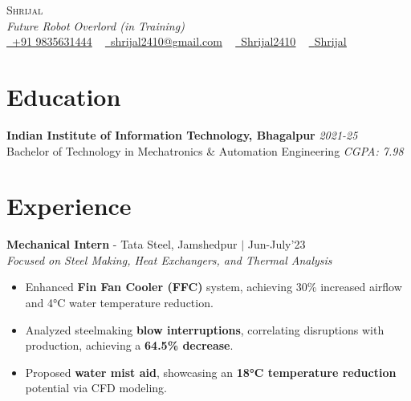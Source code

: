 \documentclass[letterpaper,11pt]{article}
\begin{document}
\begin{center}
    {\Huge \scshape Shrijal} \\[4pt]
    \textit{Future Robot Overlord (in Training)} \\[4pt]
    \href{tel:9835631444}{\color{MidnightBlue}\raisebox{-0.2\height}\faMobile\ 
    \underline {+91 9835631444}} ~
    \href{mailto:shrijal2410@gmail.com}{\color{MidnightBlue}\raisebox{-0.2\height}\faEnvelope\ \underline{shrijal2410@gmail.com}} ~ 
    \href{https://github.com/Shrijal2410}{\color{MidnightBlue}\raisebox{-0.2\height}\faGithub\ \underline{Shrijal2410}} ~
    \href{https://www.linkedin.com/in/shrijal2410/}{\color{MidnightBlue}\raisebox{-0.2\height}\faLinkedin\ \underline{Shrijal}}
\end{center}

\vspace{-8pt}

\section{Education}
\textbf{Indian Institute of Information Technology, Bhagalpur} \hfill \textit{2021-25} \\
Bachelor of Technology in Mechatronics \& Automation Engineering \hfill \textit{CGPA: 7.98}

\section{Experience}
\textbf{Mechanical Intern} - Tata Steel, Jamshedpur $|$ \emph{\color{MidnightBlue} \href{https://drive.google.com/drive/folders/1rY0DQPOfQauNFIIv6MC20OoaCbj5MJas?usp=sharing}{\faGoogleDrive{}}} \hfill Jun-July'23 \\
\textit{Focused on Steel Making, Heat Exchangers, and Thermal Analysis}
\begin{itemize}[leftmargin=*,noitemsep,topsep=-2pt]
  \item Enhanced \textbf{Fin Fan Cooler (FFC)} system, achieving 30\% increased airflow and 4°C water temperature reduction.
  \item Analyzed steelmaking \textbf{blow interruptions}, correlating disruptions with production, achieving a \textbf{64.5\% decrease}.
  \item Proposed \textbf{water mist aid}, showcasing an \textbf{18°C temperature reduction} potential via CFD modeling.
\end{itemize}

\end{document}
